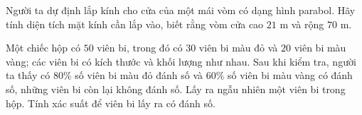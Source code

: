 \caukq
\begin{ex}
	Người ta dự định lắp kính cho cửa của một mái vòm có dạng hình parabol. Hãy tính diện tích mặt kính cần lắp vào, biết rằng vòm cửa cao $21$ m và rộng $70$ m.
\end{ex}

\begin{ex}
	Một chiếc hộp có $50$ viên bi, trong đó có $30$ viên bi màu đỏ và $20$ viên bi màu vàng; các viên bi có kích thước và khối lượng như nhau. Sau khi kiểm tra, người ta thấy có $80\%$ số viên bi màu đỏ đánh số và $60\%$ số viên bi màu vàng có đánh số, những viên bi còn lại không đánh số. Lấy ra ngẫu nhiên một viên bi trong hộp. Tính xác suất để viên bi lấy ra có đánh số.
\end{ex}

